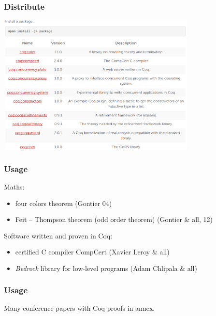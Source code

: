 \begin{frame}
  \frametitle{Distribute}
  \begin{center}
    \includegraphics[width=10cm]{images/opam}
  \end{center}
\end{frame}

\begin{frame}
  \frametitle{Usage}
  Maths:
  \begin{itemize}
    \item four colors theorem (Gontier 04)
    \item Feit -- Thompson theorem (odd order theorem) (Gontier \& all, 12)
  \end{itemize}

  Software written and proven in Coq:
  \begin{itemize}
    \item certified \textsc{C} compiler CompCert (Xavier Leroy \& all)
    \item \emph{Bedrock} library for low-level programs (Adam Chlipala \& all)
  \end{itemize}
\end{frame}

\begin{frame}
  \frametitle{Usage}
  Many conference papers with Coq proofs in annex.
\end{frame}


